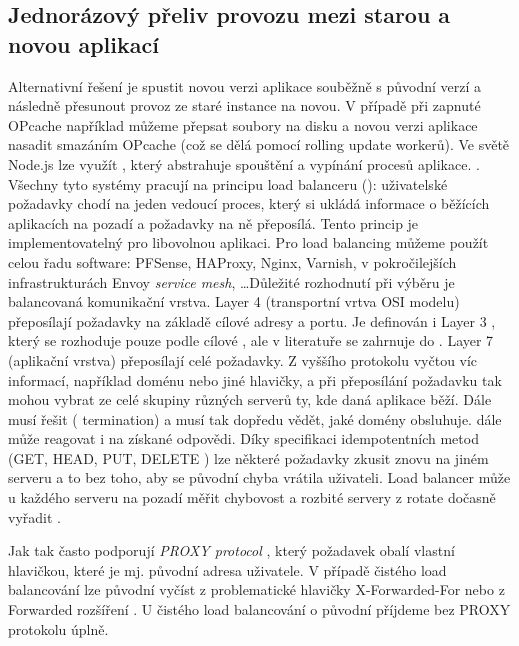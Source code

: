         \subsection{Jednorázový přeliv provozu mezi starou a novou aplikací}
            \label{deploy-v-jedne-instanci}
            Alternativní řešení je spustit novou verzi aplikace souběžně s původní verzí a následně přesunout provoz ze staré instance na novou. V případě  při zapnuté OPcache například můžeme přepsat soubory na disku a novou verzi aplikace nasadit smazáním OPcache (což se dělá pomocí rolling update  workerů). Ve světě Node.js lze využít , který abstrahuje spouštění a vypínání procesů aplikace. . Všechny tyto systémy pracují na principu load balanceru (): uživatelské požadavky chodí na jeden vedoucí proces, který si ukládá informace o běžících aplikacích na pozadí a požadavky na ně přeposílá. Tento princip je implementovatelný pro libovolnou aplikaci. Pro load balancing můžeme použít celou řadu software: PFSense, HAProxy, Nginx, Varnish, v pokročilejších infrastrukturách Envoy \textit{service mesh}, \ldots Důležité rozhodnutí při výběru  je balancovaná komunikační vrstva. Layer 4 (transportní vrtva OSI modelu)  přeposílají  požadavky na základě cílové  adresy a portu. Je definován i Layer 3 , který se rozhoduje pouze podle cílové , ale v literatuře se zahrnuje do . Layer 7 (aplikační vrstva)  přeposílají celé \HTTP požadavky. Z vyššího protokolu vyčtou víc informací, například doménu nebo jiné hlavičky, a při přeposílání požadavku tak mohou vybrat ze celé skupiny různých serverů ty, kde daná aplikace běží. Dále   musí řešit  ( termination) a musí tak dopředu vědět, jaké domény obsluhuje.   dále může reagovat i na získané \HTTP odpovědi. Díky \HTTP specifikaci idempotentních metod (GET, HEAD, PUT, DELETE \cite{http-idempotent}) lze některé požadavky zkusit znovu na jiném serveru a to bez toho, aby se původní chyba vrátila uživateli. Load balancer může u každého serveru na pozadí měřit chybovost a rozbité servery z rotate dočasně vyřadit .

            Jak  tak   často podporují \textit{PROXY protocol} \cite{tarreau-proxyprotocol}, který požadavek obalí vlastní hlavičkou, které je mj. původní  adresa uživatele. V případě čistého  load balancování lze původní  vyčíst z problematické \cite{hansen-xforwardedfor} hlavičky X-Forwarded-For nebo z Forwarded rozšíření \cite{http-forwarded}. U čistého  load balancování o původní  příjdeme bez PROXY protokolu úplně.

